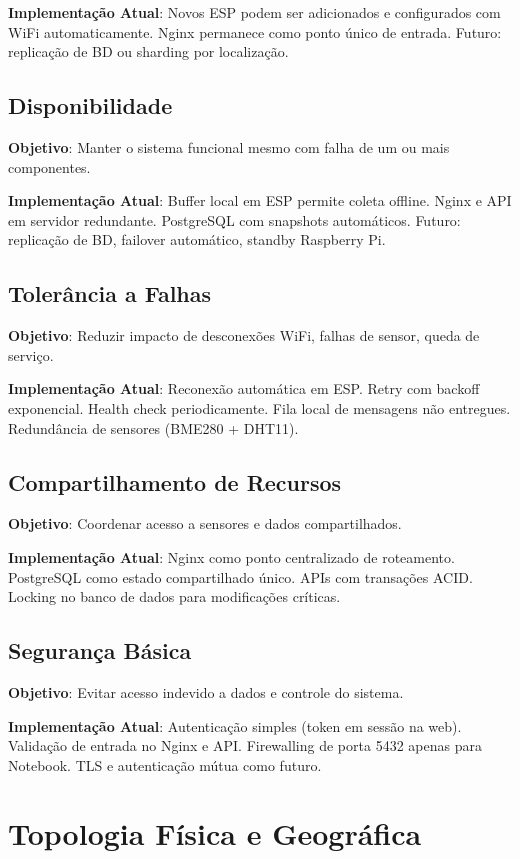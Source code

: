 \documentclass[12pt,a4paper,oneside]{report}
\begin{document}
\textbf{Implementação Atual}: Novos ESP podem ser adicionados e configurados com WiFi automaticamente. Nginx permanece como ponto único de entrada. Futuro: replicação de BD ou sharding por localização.

\section{Disponibilidade}
\textbf{Objetivo}: Manter o sistema funcional mesmo com falha de um ou mais componentes.

\textbf{Implementação Atual}: Buffer local em ESP permite coleta offline. Nginx e API em servidor redundante. PostgreSQL com snapshots automáticos. Futuro: replicação de BD, failover automático, standby Raspberry Pi.

\section{Tolerância a Falhas}
\textbf{Objetivo}: Reduzir impacto de desconexões WiFi, falhas de sensor, queda de serviço.

\textbf{Implementação Atual}: Reconexão automática em ESP. Retry com backoff exponencial. Health check periodicamente. Fila local de mensagens não entregues. Redundância de sensores (BME280 + DHT11).

\section{Compartilhamento de Recursos}
\textbf{Objetivo}: Coordenar acesso a sensores e dados compartilhados.

\textbf{Implementação Atual}: Nginx como ponto centralizado de roteamento. PostgreSQL como estado compartilhado único. APIs com transações ACID. Locking no banco de dados para modificações críticas.

\section{Segurança Básica}
\textbf{Objetivo}: Evitar acesso indevido a dados e controle do sistema.

\textbf{Implementação Atual}: Autenticação simples (token em sessão na web). Validação de entrada no Nginx e API. Firewalling de porta 5432 apenas para Notebook. TLS e autenticação mútua como futuro.

\chapter{Topologia Física e Geográfica}
\end{document}
